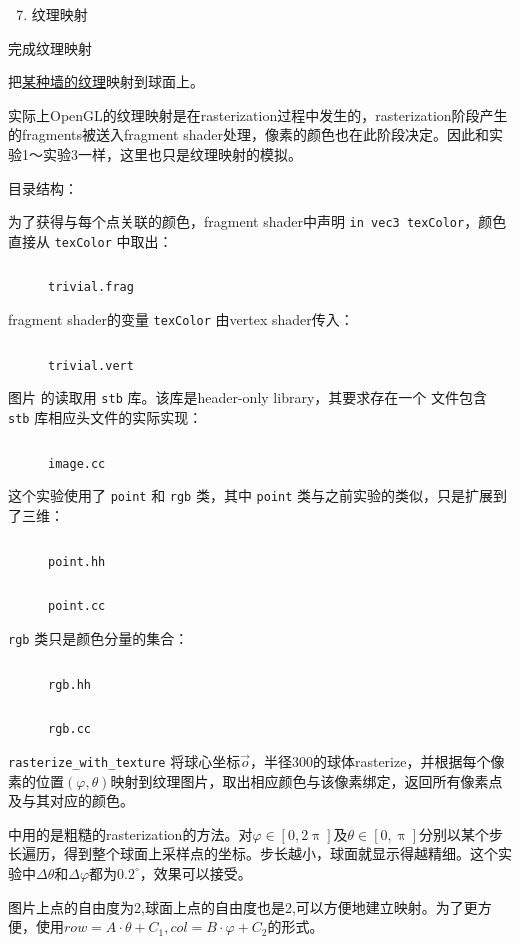 \documentclass{cumtbrep}
\newcommand\inputcode[3][c++]{%
	\inputminted{#1}{#2}
	\begin{figure}[H]
		\centering
		\captionsetup{type=table}
		\caption{\texttt{#3}}
	\end{figure}
}
\newcommand\inline[2][c++]{\texttt{#2}}
\begin{document}

\namesec
\begin{enumerate}
	\setcounter{enumi}{6}
	\item 纹理映射
\end{enumerate}

\purposesec
\noindent 完成纹理映射

\contentsec
把\hyperref[fig:wall]{某种墙的纹理}映射到球面上。

实际上OpenGL的纹理映射是在rasterization过程中发生的，rasterization阶段产生的fragments被送入fragment shader处理，像素的颜色也在此阶段决定。因此和实验1～实验3一样，这里也只是纹理映射的模拟。

目录结构：{\ttfamily }

为了获得与每个点关联的颜色，fragment shader中声明 \inline[glsl]{in vec3 texColor}，颜色直接从 \inline[glsl]{texColor} 中取出：
\inputcode[glsl]{../texture/trivial.frag}{trivial.frag}

fragment shader的变量 \inline[glsl]{texColor} 由vertex shader传入：
\inputcode[glsl]{../texture/trivial.vert}{trivial.vert}

图片  的读取用 \inline{stb} 库。该库是header-only library，其要求存在一个  文件包含 \inline{stb} 库相应头文件的实际实现：
\inputcode{../texture/image.cc}{image.cc}

这个实验使用了 \inline{point} 和 \inline{rgb} 类，其中 \inline{point} 类与之前实验的类似，只是扩展到了三维：
\inputcode{../texture/point.hh}{point.hh}
\inputcode{../texture/point.cc}{point.cc}

\inline{rgb} 类只是颜色分量的集合：
\inputcode{../texture/rgb.hh}{rgb.hh}
\inputcode{../texture/rgb.cc}{rgb.cc}

\inline{rasterize_with_texture} 将球心坐标$\vec o$，半径$300$的球体rasterize，并根据每个像素的位置$(\varphi,\theta)$映射到纹理图片，取出相应颜色与该像素绑定，返回所有像素点及与其对应的颜色。

 中用的是粗糙的rasterization的方法。对$\varphi \in [0,2\uppi]$及$\theta \in [0,\uppi]$分别以某个步长遍历，得到整个球面上采样点的坐标。步长越小，球面就显示得越精细。这个实验中$\Delta\theta$和$\Delta\varphi$都为$0.2^\circ$，效果可以接受。

图片上点的自由度为2,球面上点的自由度也是2,可以方便地建立映射。为了更方便，使用$\mathit{row}=A\cdot\theta+C_1,\mathit{col}=B\cdot\varphi+C_2$的形式。
\end{document}
